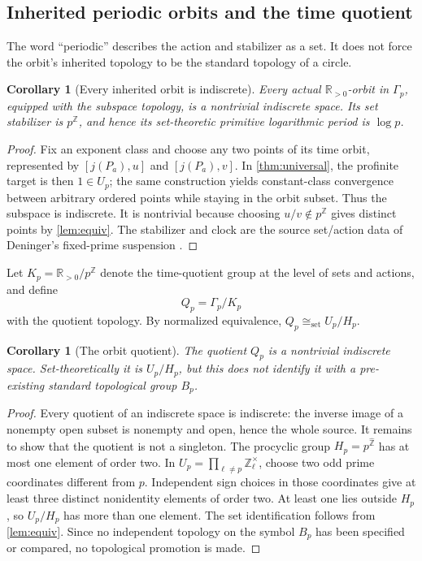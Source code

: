 \documentclass[11pt]{article}
\newtheorem{corollary}[theorem]{Corollary}
\theoremstyle{definition}
\newcommand{\R}{\mathbb{R}}
\newcommand{\Z}{\mathbb{Z}}
\newcommand{\Zhat}{\widehat{\mathbb Z}}
\begin{document}
\subsection{Inherited periodic orbits and the time quotient}

The word ``periodic'' describes the action and stabilizer as a set.  It does not force the orbit's inherited topology to be the standard topology of a circle.

\begin{corollary}[Every inherited orbit is indiscrete]\label{cor:orbit}
Every actual \(\R_{>0}\)-orbit in \(\Gamma_p\), equipped with the subspace topology, is a nontrivial indiscrete space.  Its set stabilizer is \(p^{\Z}\), and hence its set-theoretic primitive logarithmic period is \(\log p\).
\end{corollary}

\begin{proof}
Fix an exponent class and choose any two points of its time orbit, represented by \([j(P_a),u]\) and \([j(P_a),v]\).  In \cref{thm:universal}, the profinite target is then \(1\in U_p\); the same construction yields constant-class convergence between arbitrary ordered points while staying in the orbit subset.  Thus the subspace is indiscrete.  It is nontrivial because choosing \(u/v\notin p^{\Z}\) gives distinct points by \cref{lem:equiv}.  The stabilizer and clock are the source set/action data of Deninger's fixed-prime suspension \cite[Theorem~6.1, physical pp.~38--39]{Deninger2026}.
\end{proof}

Let \(K_p=\R_{>0}/p^{\Z}\) denote the time-quotient group at the level of sets and actions, and define
\[
 Q_p=\Gamma_p/K_p
\]
with the quotient topology.  By normalized equivalence, \(Q_p\cong_{\mathrm{set}}U_p/H_p\).

\begin{corollary}[The orbit quotient]\label{cor:Qp}
The quotient \(Q_p\) is a nontrivial indiscrete space.  Set-theoretically it is \(U_p/H_p\), but this does not identify it with a pre-existing standard topological group \(B_p\).
\end{corollary}

\begin{proof}
Every quotient of an indiscrete space is indiscrete: the inverse image of a nonempty open subset is nonempty and open, hence the whole source.  It remains to show that the quotient is not a singleton.  The procyclic group \(H_p=p^{\Zhat}\) has at most one element of order two.  In \(U_p=\prod_{\ell\ne p}\Z_\ell^\times\), choose two odd prime coordinates different from \(p\).  Independent sign choices in those coordinates give at least three distinct nonidentity elements of order two.  At least one lies outside \(H_p\), so \(U_p/H_p\) has more than one element.  The set identification follows from \cref{lem:equiv}.  Since no independent topology on the symbol \(B_p\) has been specified or compared, no topological promotion is made.
\end{proof}
\end{document}
